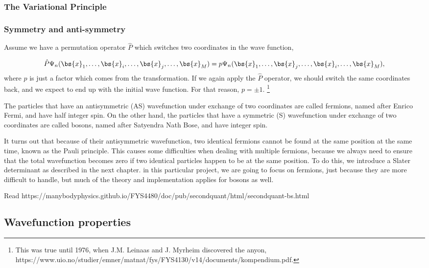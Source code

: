 \subsubsection{The Variational Principle}

\subsubsection{Symmetry and anti-symmetry} \label{subsubsec:symmetry}
Assume we have a permutation operator $\hat{P}$ which switches two coordinates in the wave function,

\begin{equation}
\hat{P}\Psi_n(\bs{x}_1,\hdots,\bs{x}_i,\hdots,\bs{x}_j,\hdots,\bs{x}_M)=p\Psi_n(\bs{x}_1,\hdots,\bs{x}_j,\hdots,\bs{x}_i,\hdots,\bs{x}_M),
\end{equation}
where $p$ is just a factor which comes from the transformation. If we again apply the $\hat{P}$ operator, we should switch the same coordinates back, and we expect to end up with the initial wave function. For that reason, $p=\pm1$. \footnote{This was true until 1976, when J.M. Leinaas and J. Myrheim discovered the anyon, https://www.uio.no/studier/emner/matnat/fys/FYS4130/v14/documents/kompendium.pdf.}

The particles that have an antisymmetric (AS) wavefunction under exchange of two coordinates are called fermions, named after Enrico Fermi, and have half integer spin. On the other hand, the particles that have a symmetric (S) wavefunction under exchange of two coordinates are called bosons, named after Satyendra Nath Bose, and have integer spin. 

It turns out that because of their antisymmetric wavefunction, two identical fermions cannot be found at the same position at the same time, known as the Pauli principle. This causes some difficulties when dealing with multiple fermions, because we always need to ensure that the total wavefunction becomes zero if two identical particles happen to be at the same position. To do this, we introduce a Slater determinant as described in the next chapter. in this particular project, we are going to focus on fermions, just because they are more difficult to handle, but much of the theory and implementation applies for bosons as well. 

Read https://manybodyphysics.github.io/FYS4480/doc/pub/secondquant/html/secondquant-bs.html

\subsection{Wavefunction properties} \label{subsec:wavefunction}



